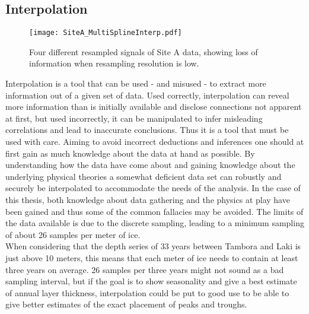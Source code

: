 \documentclass[../../CompleteThesis2/Complete_2ndDraft]{subfiles}
\begin{document}
\subsection[Interpolation][Interpolation]{Interpolation}
\label{Subsec:CompMeths_SplinesAndInterpolation_Interpolation}
\begin{figure}[h]
	\centering
	\texttt{[image: SiteA\_MultiSplineInterp.pdf]}
	\caption[Different resamplings of Site A]{\small Four different resampled signals of Site A data, showing loss of information when resampling resolution is low.}
	\label{Fig:COMPMETH_SiteA_MultiSplineInterp}
\end{figure}
Interpolation is a tool that can be used - and misused - to extract more information out of a given set of data. Used correctly, interpolation can reveal more information than is initially available and disclose connections not apparent at first, but used incorrectly, it can be manipulated to infer misleading correlations and lead to inaccurate conclusions. Thus it is a tool that must be used with care. Aiming to avoid incorrect deductions and inferences one should at first gain as much knowledge about the data at hand as possible. By understanding how the data have come about and gaining knowledge about the underlying physical theories a somewhat deficient data set can robustly and securely be interpolated to accommodate the needs of the analysis. In the case of this thesis, both knowledge about data gathering and the physics at play have been gained and thus some of the common fallacies may be avoided. The limits of the data available is due to the discrete sampling, leading to a minimum sampling of about 26 samples per meter of ice.\\
When considering that the depth series of 33 years between Tambora and Laki is just above 10 meters, this means that each meter of ice needs to contain at least three years on average. 26 samples per three years might not sound as a bad sampling interval, but if the goal is to show seasonality and give a best estimate of annual layer thickness, interpolation could be put to good use to be able to give better estimates of the exact placement of peaks and troughs.




\end{document}
